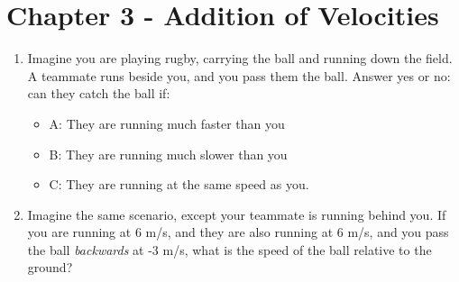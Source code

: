 \documentclass{article}
\begin{document}
\section{Chapter 3 - Addition of Velocities}

\begin{enumerate}
\item Imagine you are playing rugby, carrying the ball and running down the field.  A teammate runs beside you, and you pass them the ball.  Answer yes or no: can they catch the ball if:
\begin{itemize}
\item A: They are running much faster than you
\item B: They are running much slower than you
\item C: They are running at the same speed as you.
\end{itemize}
\item Imagine the same scenario, except your teammate is running behind you.  If you are running at 6 m/s, and they are also running at 6 m/s, and you pass the ball \textit{backwards} at -3 m/s, what is the speed of the ball relative to the ground?
\end{enumerate}
\end{document}
